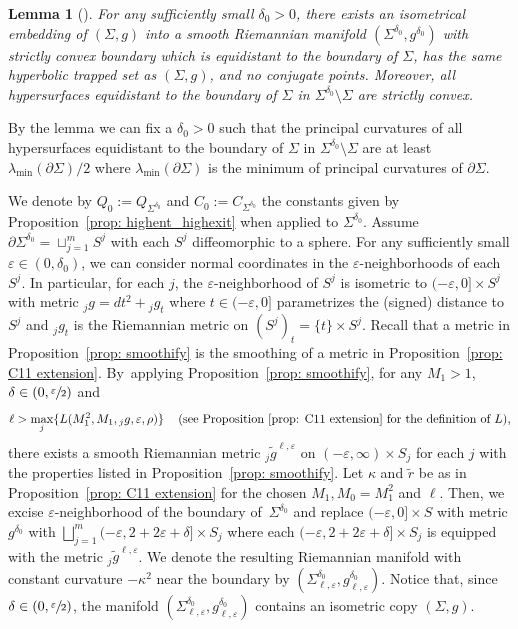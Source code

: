 \documentclass[10pt]{amsart}
\newtheorem{lemma}[theorem]{Lemma}
\theoremstyle{definition}
\let\eps\varepsilon
\renewcommand{\>}{{\rangle}}
\newcommand{\<}{{\langle}}
\begin{document}
\begin{lemma}[{\cite[Lem.\,2.3]{G17}}] \label{lem: extend_metric}
For any sufficiently small $\delta_0>0$, there exists an isometrical embedding of $(\Sigma, g)$ into a smooth Riemannian manifold $(\Sigma^{\delta_0}, g^{\delta_0})$ with strictly convex boundary which is equidistant to the boundary of $\Sigma$, has the same hyperbolic trapped set as $(\Sigma,g)$, and no conjugate points. Moreover, all hypersurfaces equidistant to the boundary of $\Sigma$ in $\Sigma^{\delta_0}\setminus \Sigma$ are strictly convex.
\end{lemma}

By the lemma we can fix a $\delta_0>0$ such that the principal curvatures of all hypersurfaces equidistant to the boundary of $\Sigma$ in $\Sigma^{\delta_0}\setminus \Sigma$ are at least $\lambda_{\min}(\partial\Sigma)/2$ where $\lambda_{\min}(\partial\Sigma)$ is the minimum of principal curvatures of $\partial\Sigma$.

We denote by $Q_0:=Q_{\Sigma^{\delta_0}}$ and $C_0:=C_{\Sigma^{\delta_0}}$ the constants given by Proposition~\ref{prop: highent_highexit} when applied to $\Sigma^{\delta_0}$.
Assume $\partial\Sigma^{\delta_0}=\sqcup_{j=1}^m S^j$ with each $S^j$ diffeomorphic to a sphere. For any sufficiently small { $\eps\in(0,\delta_0)$,} we can consider normal coordinates in the $\eps$-neighborhoods of each $S^j$. In particular, for each $j$, the $\eps$-neighborhood of $S^j$ is isometric to $(-\eps,0]\times S^j$ with metric ${}_jg=dt^2+{}_jg_t$ where $t\in(-\eps,0]$ parametrizes the (signed) distance to $S^j$ and ${}_jg_t$ is the Riemannian metric on $\left(S^j\right)_t=\{t\}\times S^j$. Recall that a metric in Proposition~\ref{prop: smoothify} is the smoothing of a metric in Proposition~\ref{prop: C11 extension}. By~applying Proposition~\ref{prop: smoothify}, for any $M_1>1$, $\delta\in(0,\sfrac{\eps}{2})$ and
\begin{equation}\label{cond: collar_curv}
\ell>\max_{j}\{L(M_1^2,M_1, {}_jg, \eps, \rho)\} \quad \,\text{(see Proposition~\ref{prop: C11 extension} for the definition of $L$),}
\end{equation}
there exists a smooth Riemannian metric ${}_j\tilde g^{\ell,\eps}$ on $(-\eps,\infty)\times S_j$ for each $j$ with the properties listed in Proposition~\ref{prop: smoothify}. Let $\kappa$ and $\tilde r$ be as in Proposition~\ref{prop: C11 extension} for the chosen $M_1, M_0=M_1^2$ and $\ell$. Then, we excise $\eps$-neighborhood of the boundary of~$\Sigma^{\delta_0}$ and replace $(-\eps,0]\times S$ with metric $g^{\delta_0}$ with $\bigsqcup_{j=1}^m(-\eps, 2+2\eps+\delta]\times S_j$ where each $(-\eps, 2+2\eps+\delta]\times S_j$ is equipped with the metric ${}_j\tilde g^{\ell,\eps}$. We denote the resulting Riemannian manifold with constant curvature $-\kappa^2$ near the boundary by $(\Sigma^{\delta_0}_{\ell,\eps}, g^{\delta_0}_{\ell,\eps})$. Notice that, since $\delta\in(0,\sfrac{\eps}{2})$, the manifold $(\Sigma^{\delta_0}_{\ell,\eps}, g^{\delta_0}_{\ell,\eps})$ contains an isometric copy $(\Sigma,g)$.
\end{document}
